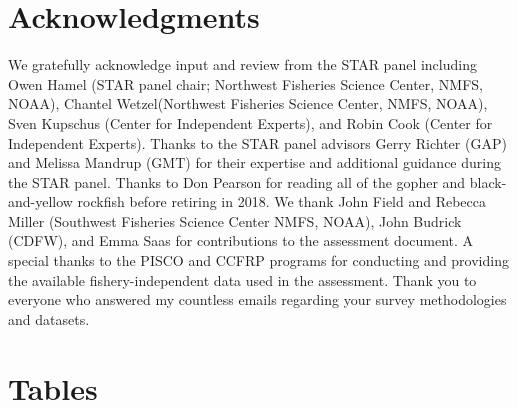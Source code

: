 \documentclass[12pt,]{article}
\begin{document}
\section{Acknowledgments}\label{acknowledgments}

We gratefully acknowledge input and review from the STAR panel including
Owen Hamel (STAR panel chair; Northwest Fisheries Science Center, NMFS,
NOAA), Chantel Wetzel(Northwest Fisheries Science Center, NMFS, NOAA),
Sven Kupschus (Center for Independent Experts), and Robin Cook (Center
for Independent Experts). Thanks to the STAR panel advisors Gerry
Richter (GAP) and Melissa Mandrup (GMT) for their expertise and
additional guidance during the STAR panel. Thanks to Don Pearson for
reading all of the gopher and black-and-yellow rockfish before retiring
in 2018. We thank John Field and Rebecca Miller (Southwest Fisheries
Science Center NMFS, NOAA), John Budrick (CDFW), and Emma Saas for
contributions to the assessment document. A special thanks to the PISCO
and CCFRP programs for conducting and providing the available
fishery-independent data used in the assessment. Thank you to everyone
who answered my countless emails regarding your survey methodologies and
datasets.

\newpage

\FloatBarrier

\section{Tables}\label{tables}

\FloatBarrier
\end{document}
